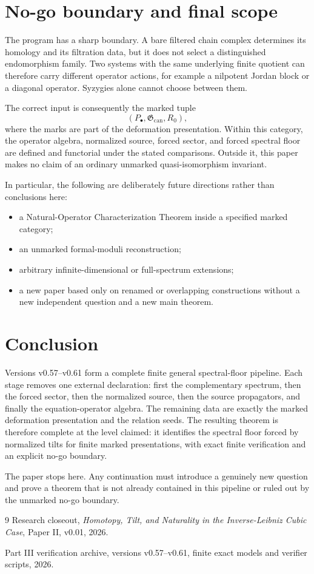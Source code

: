 \documentclass[11pt]{article}
\theoremstyle{definition}
\newcommand{\Gcan}{\mathfrak G_{\mathrm{can}}}
\begin{document}
\section{No-go boundary and final scope}

The program has a sharp boundary. A bare filtered chain complex determines its homology and its
filtration data, but it does not select a distinguished endomorphism family. Two systems with the
same underlying finite quotient can therefore carry different operator actions, for example a
nilpotent Jordan block or a diagonal operator. Syzygies alone cannot choose between them.

The correct input is consequently the marked tuple
\[
(P_\bullet,\Gcan,R_0),
\]
where the marks are part of the deformation presentation. Within this category, the operator
algebra, normalized source, forced sector, and forced spectral floor are defined and functorial under
the stated comparisons. Outside it, this paper makes no claim of an ordinary unmarked
quasi-isomorphism invariant.

In particular, the following are deliberately future directions rather than conclusions here:
\begin{itemize}[leftmargin=2em]
\item a Natural-Operator Characterization Theorem inside a specified marked category;
\item an unmarked formal-moduli reconstruction;
\item arbitrary infinite-dimensional or full-spectrum extensions;
\item a new paper based only on renamed or overlapping constructions without a new independent
question and a new main theorem.
\end{itemize}

\section{Conclusion}

Versions v0.57--v0.61 form a complete finite general spectral-floor pipeline. Each stage removes one
external declaration: first the complementary spectrum, then the forced sector, then the normalized
source, then the source propagators, and finally the equation-operator algebra. The remaining data
are exactly the marked deformation presentation and the relation seeds. The resulting theorem is
therefore complete at the level claimed: it identifies the spectral floor forced by normalized tilts
for finite marked presentations, with exact finite verification and an explicit no-go boundary.

The paper stops here. Any continuation must introduce a genuinely new question and prove a theorem
that is not already contained in this pipeline or ruled out by the unmarked no-go boundary.

\begin{thebibliography}{9}
Research closeout, \emph{Homotopy, Tilt, and Naturality in the Inverse-Leibniz Cubic Case},
Paper II, v0.01, 2026.

Part III verification archive, versions v0.57--v0.61, finite exact models and verifier scripts,
2026.
\end{thebibliography}
\end{document}
